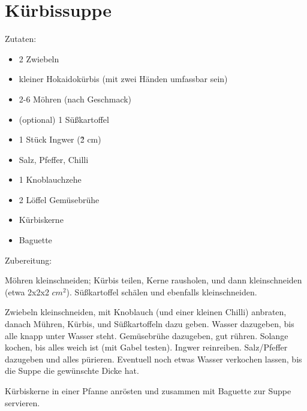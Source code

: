 \section{Kürbissuppe}
Zutaten:
\begin{itemize}
    \item 2 Zwiebeln
    \item kleiner Hokaidokürbis (mit zwei Händen umfassbar sein)
    \item 2-6 Möhren (nach Geschmack)
    \item (optional) 1 Süßkartoffel
    \item 1 Stück Ingwer (\~ 2 cm)
    \item Salz, Pfeffer, Chilli
    \item 1 Knoblauchzehe
    \item 2 Löffel Gemüsebrühe
    \item Kürbiskerne
    \item Baguette
\end{itemize}

\noindent Zubereitung:

Möhren kleinschneiden; Kürbis teilen, Kerne rausholen, und dann kleinschneiden
(etwa 2x2x2 $cm^2$). Süßkartoffel schälen und ebenfalls kleinschneiden.

Zwiebeln kleinschneiden, mit Knoblauch (und einer kleinen Chilli) anbraten,
danach Mühren, Kürbis, und Süßkartoffeln dazu geben. Wasser dazugeben, bis alle
knapp unter Wasser steht. Gemüsebrühe dazugeben, gut rühren. Solange kochen,
bis alles weich ist (mit Gabel testen). Ingwer reinreiben. Salz/Pfeffer
dazugeben und alles pürieren. Eventuell noch etwas Wasser verkochen lassen, bis
die Suppe die gewünschte Dicke hat.

Kürbiskerne in einer Pfanne anrösten und zusammen mit Baguette zur Suppe
servieren.
\noindent
\mbox{}
\vfill
\begin{center}
\end{center}
\vfill
\mbox{ }
\newpage
